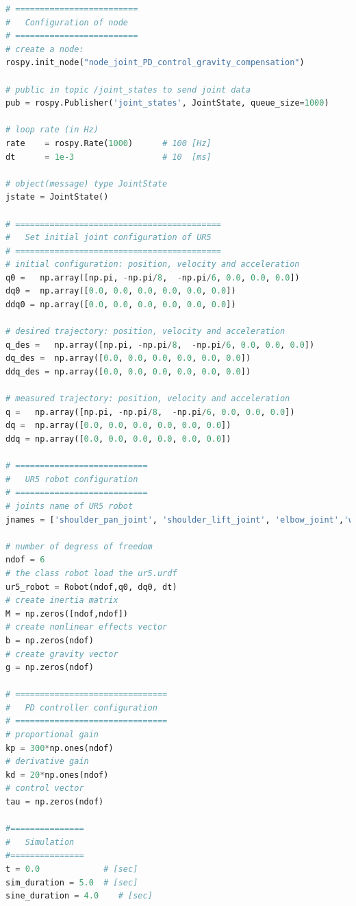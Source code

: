 \begin{lstlisting}[language=Python,caption={Move the second and fifth joint of UR5 robot with the requirement motion of activity 1.6.2}, label={lst:joint_PD_gravity_compensation_control_method_sinusoidal}]
# =========================
#   Configuration of node
# =========================
# create a node: 
rospy.init_node("node_joint_PD_control_gravity_compensation")

# public in topic /joint_states	to send joint data	
pub = rospy.Publisher('joint_states', JointState, queue_size=1000)

# loop rate (in Hz)
rate 	= rospy.Rate(1000)		# 100 [Hz]
dt 		= 1e-3					# 10  [ms]

# object(message) type JointState
jstate = JointState()

# ==========================================
#   Set initial joint configuration of UR5
# ==========================================
# initial configuration: position, velocity and acceleration 
q0 =   np.array([np.pi, -np.pi/8,  -np.pi/6, 0.0, 0.0, 0.0])
dq0 =  np.array([0.0, 0.0, 0.0, 0.0, 0.0, 0.0]) 
ddq0 = np.array([0.0, 0.0, 0.0, 0.0, 0.0, 0.0]) 

# desired trajectory: position, velocity and acceleration
q_des =   np.array([np.pi, -np.pi/8,  -np.pi/6, 0.0, 0.0, 0.0]) 
dq_des =  np.array([0.0, 0.0, 0.0, 0.0, 0.0, 0.0]) 
ddq_des = np.array([0.0, 0.0, 0.0, 0.0, 0.0, 0.0]) 

# measured trajectory: position, velocity and acceleration
q =   np.array([np.pi, -np.pi/8,  -np.pi/6, 0.0, 0.0, 0.0])
dq =  np.array([0.0, 0.0, 0.0, 0.0, 0.0, 0.0]) 
ddq = np.array([0.0, 0.0, 0.0, 0.0, 0.0, 0.0]) 

# ===========================
#   UR5 robot configuration
# ===========================
# joints name of UR5 robot
jnames = ['shoulder_pan_joint', 'shoulder_lift_joint', 'elbow_joint','wrist_1_joint', 'wrist_2_joint', 'wrist_3_joint']

# number of degress of freedom
ndof = 6
# the class robot load the ur5.urdf
ur5_robot = Robot(ndof,q0, dq0, dt)
# create inertia matrix 
M = np.zeros([ndof,ndof])
# create nonlinear effects vector
b = np.zeros(ndof)
# create gravity vector
g = np.zeros(ndof)

# ===============================
#   PD controller configuration
# ===============================
# proportional gain
kp = 300*np.ones(ndof)
# derivative gain
kd = 20*np.ones(ndof)
# control vector
tau = np.zeros(ndof)    

#===============
#   Simulation
#===============
t = 0.0             # [sec] 
sim_duration = 5.0  # [sec]
sine_duration = 4.0    # [sec]


\end{lstlisting}
